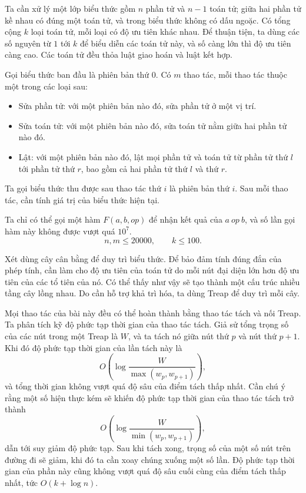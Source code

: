 \documentclass[11pt]{article}
\begin{document}
Ta cần xử lý một lớp biểu thức gồm \(n\) phần tử và \(n-1\) toán tử; giữa hai
phần tử kề nhau có đúng một toán tử, và trong biểu thức không có dấu ngoặc. Có
tổng cộng \(k\) loại toán tử, mỗi loại có độ ưu tiên khác nhau. Để thuận tiện,
ta dùng các số nguyên từ \(1\) tới \(k\) để biểu diễn các toán tử này, và số
càng lớn thì độ ưu tiên càng cao. Các toán tử đều thỏa luật giao hoán và luật
kết hợp.

Gọi biểu thức ban đầu là phiên bản thứ \(0\). Có \(m\) thao tác, mỗi thao tác
thuộc một trong các loại sau:

\begin{itemize}
  \item Sửa phần tử: với một phiên bản nào đó, sửa phần tử ở một vị trí.
  \item Sửa toán tử: với một phiên bản nào đó, sửa toán tử nằm giữa hai phần
  tử nào đó.
  \item Lật: với một phiên bản nào đó, lật mọi phần tử và toán tử từ phần tử
  thứ \(l\) tới phần tử thứ \(r\), bao gồm cả hai phần tử thứ \(l\) và thứ
  \(r\).
\end{itemize}

Ta gọi biểu thức thu được sau thao tác thứ \(i\) là phiên bản thứ \(i\). Sau mỗi
thao tác, cần tính giá trị của biểu thức hiện tại.

Ta chỉ có thể gọi một hàm \(F(a,b,\textit{op})\) để nhận kết quả của
\(a\ \textit{op}\ b\), và số lần gọi hàm này không được vượt quá \(10^7\).
\[
  n,m\le 20000,\qquad k\le 100.
\]

Xét dùng cây cân bằng để duy trì biểu thức. Để bảo đảm tính đúng đắn của phép
tính, cần làm cho độ ưu tiên của toán tử do mỗi nút đại diện lớn hơn độ ưu tiên
của các tổ tiên của nó. Có thể thấy như vậy sẽ tạo thành một cấu trúc nhiều
tầng cây lồng nhau. Do cần hỗ trợ khả trì hóa, ta dùng Treap để duy trì mỗi
cây.

Mọi thao tác của bài này đều có thể hoàn thành bằng thao tác tách và nối Treap.
Ta phân tích kỹ độ phức tạp thời gian của thao tác tách. Giả sử tổng trọng số
của các nút trong một Treap là \(W\), và ta tách nó giữa nút thứ \(p\) và nút
thứ \(p+1\). Khi đó độ phức tạp thời gian của lần tách này là
\[
  O\left(\log\frac{W}{\max(w_p,w_{p+1})}\right),
\]
và tổng thời gian không vượt quá độ sâu của điểm tách thấp nhất. Cần chú ý rằng
một số hiện thực kém sẽ khiến độ phức tạp thời gian của thao tác tách trở thành
\[
  O\left(\log\frac{W}{\min(w_p,w_{p+1})}\right),
\]
dẫn tới suy giảm độ phức tạp. Sau khi tách xong, trọng số của một số nút trên
đường đi sẽ giảm, khi đó ta cần xoay chúng xuống một số lần. Độ phức tạp thời
gian của phần này cũng không vượt quá độ sâu cuối cùng của điểm tách thấp nhất,
tức \(O(k+\log n)\).
\end{document}
